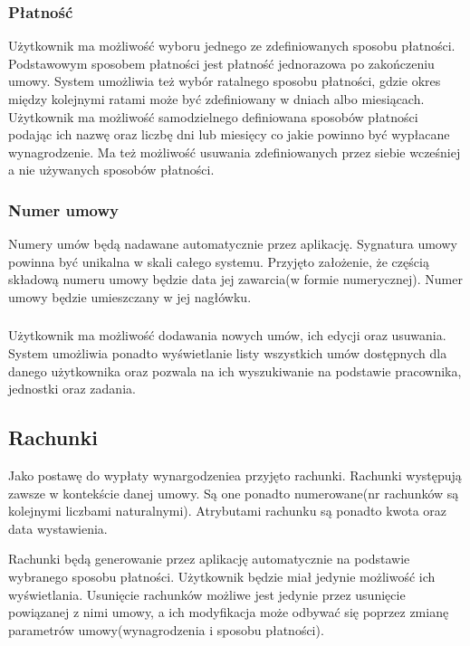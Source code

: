 \subsubsection{Płatność}
Użytkownik ma możliwość wyboru jednego ze zdefiniowanych sposobu płatności. Podstawowym sposobem płatności jest płatność jednorazowa po zakończeniu umowy. System umożliwia też wybór ratalnego sposobu płatności, gdzie okres między kolejnymi ratami może być zdefiniowany w dniach albo miesiącach. Użytkownik ma możliwość samodzielnego definiowana sposobów płatności podając ich nazwę oraz liczbę dni lub miesięcy co jakie powinno być wypłacane wynagrodzenie. Ma też możliwość usuwania zdefiniowanych przez siebie wcześniej a nie używanych sposobów płatności. 

\subsubsection{Numer umowy}
Numery umów będą nadawane automatycznie przez aplikację. Sygnatura umowy powinna być unikalna w skali całego systemu. Przyjęto założenie, że częścią składową numeru umowy będzie data jej zawarcia(w formie numerycznej). Numer umowy będzie umieszczany w jej nagłówku.

\subsubsection{}
Użytkownik ma możliwość dodawania nowych umów, ich edycji oraz usuwania. System umożliwia ponadto wyświetlanie listy wszystkich umów dostępnych dla danego użytkownika oraz pozwala na ich wyszukiwanie na podstawie pracownika, jednostki oraz zadania.

\subsection[Rachunki][Rachunki]{Rachunki}
Jako postawę do wypłaty wynargodzeniea przyjęto rachunki. Rachunki występują zawsze w kontekście danej umowy. Są one ponadto numerowane(nr rachunków są kolejnymi liczbami naturalnymi). Atrybutami rachunku są ponadto kwota oraz data wystawienia.

Rachunki będą generowanie przez aplikację automatycznie na podstawie wybranego sposobu płatności. Użytkownik będzie miał jedynie możliwość ich wyświetlania. Usunięcie rachunków możliwe jest jedynie przez usunięcie powiązanej z nimi umowy, a ich modyfikacja może odbywać się poprzez zmianę parametrów umowy(wynagrodzenia i sposobu płatności).

